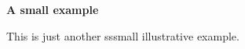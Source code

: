 \documentclass{article}
\begin{document}
  \begin{huge}
    \bfseries
      A small example
  \end{huge}
  This is just another sssmall illustrative example.
\end{document}
